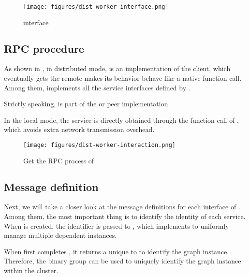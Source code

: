 \begin{content}
\begin{figure}[H]
  \centering
  \texttt{[image: figures/dist-worker-interface.png]}
  \caption{interface}
  \label{fig:dist-worker-interface}
\end{figure}


\subsection{RPC procedure}
As shown in , in distributed mode,  is an implementation of the  client, which eventually gets the remote  makes its behavior behave like a native function call. Among them,  implements all the service interfaces defined by .

\begin{remark}
Strictly speaking,  is part of the  or peer implementation.
\end{remark}

In the local mode, the  service is directly obtained through the function call of , which avoids extra network transmission overhead.

\begin{figure}[H]
  \centering
  \texttt{[image: figures/dist-worker-interaction.png]}
  \caption{Get the RPC process of }
  \label{fig:dist-worker-interaction}
\end{figure}


\subsection{Message definition}
Next, we will take a closer look at the message definitions for each interface of . Among them, the most important thing is to identify the identity of each service. When  is created, the  identifier is passed to , which implements  to uniformly manage multiple dependent  instances.

When  first completes , it returns a unique  to  to identify the graph instance. Therefore, the  binary group can be used to uniquely identify the graph instance within the cluster.


\end{content}
